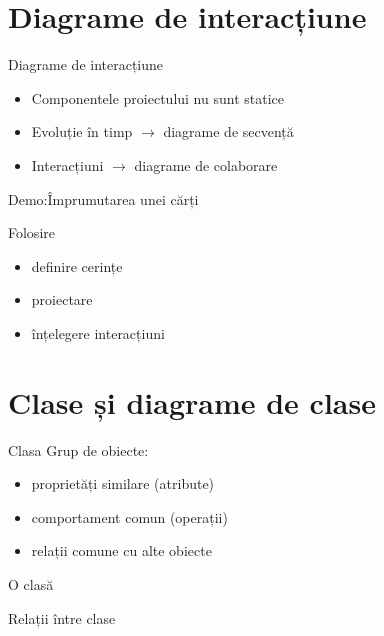\documentclass{beamer}
\begin{document}
\section{Diagrame de interacțiune}

\begin{frame}{Diagrame de interacțiune}
  \begin{itemize}[<+->]
    \item Componentele proiectului nu sunt statice
    \item Evoluție în timp $\rightarrow$ diagrame de secvență
    \item Interacțiuni $\rightarrow$ diagrame de colaborare
  \end{itemize}
\end{frame}

\begin{frame}{Demo:Împrumutarea unei cărți}
\end{frame}

\begin{frame}{Folosire}
  \begin{itemize}[<+->]
    \item definire cerințe
    \item proiectare
    \item înțelegere interacțiuni
  \end{itemize}
\end{frame}

\section{Clase și diagrame de clase}

\begin{frame}{Clasa}
  Grup de obiecte:
  \begin{itemize}[<+->]
    \item proprietăți similare (atribute)
    \item comportament comun (operații)
    \item relații comune cu alte obiecte
  \end{itemize}
\end{frame}

\begin{frame}[label=c]{O clasă}
\end{frame}

\begin{frame}[label=c]{Relații între clase}
\end{frame}
\end{document}
